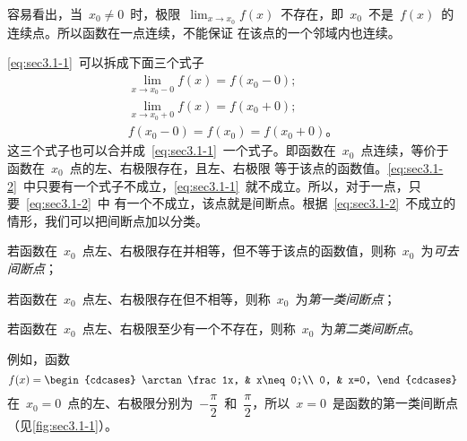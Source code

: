 \begin{remark}
容易看出，当~$x_0\neq0$~时，极限~$\lim_{x\to x_0}f(x)$~不存在，即~$x_0$~不是~$f(x)$~的连续点。所以函数在一点连续，不能保证
在该点的一个邻域内也连续。
\end{remark}

\ref{eq:sec3.1-1}~可以拆成下面三个式子
\begin{equation}\label{eq:sec3.1-2}
\begin{gathered}
\lim_{x\to x_0-0}f(x)=f(x_0-0);\\
\lim_{x\to x_0+0}f(x)=f(x_0+0);\\
f(x_0-0)=f(x_0)=f(x_0+0) 。
\end{gathered}
\end{equation}
这三个式子也可以合并成~\ref{eq:sec3.1-1}~一个式子。即函数在~$x_0$~点连续，等价于函数在~$x_0$~点的左、右极限存在，且左、右极限
等于该点的函数值。\ref{eq:sec3.1-2}~中只要有一个式子不成立，\ref{eq:sec3.1-1}~就不成立。所以，对于一点，只要~\ref{eq:sec3.1-2}~中
有一个不成立，该点就是间断点。根据~\ref{eq:sec3.1-2}~不成立的情形，我们可以把间断点加以分类。

\begin{definition}\label{def:sec3.1-2}
\begin{thmenumlist}
\item 若函数在~$x_0$~点左、右极限存在并相等，但不等于该点的函数值，则称~$x_0$~为\emph{可去间断点}；
\item 若函数在~$x_0$~点左、右极限存在但不相等，则称~$x_0$~为\emph{第一类间断点}；
\item 若函数在~$x_0$~点左、右极限至少有一个不存在，则称~$x_0$~为\emph{第二类间断点}。
\end{thmenumlist}
\end{definition}

例如，函数
\[
  f(x)=\begin{cdcases}
    \arctan\frac1x, & x\neq0;\\
    0, & x=0,
  \end{cdcases}
\]
在~$x_0=0$~点的左、右极限分别为~$-\dfrac\pi2$~和~$\dfrac\pi2$，所以~$x=0$~是函数的第一类间断点（见\ref{fig:sec3.1-1}）。

\begin{figure}
\begin{floatrow}[3]
\figurebox{\caption{}\label{fig:sec3.1-1}}
          {\somefigure}
\figurebox{\caption{}\label{fig:sec3.1-2}}
          {\somefigure}
\figurebox{\caption{}\label{fig:sec3.1-3}}
          {\somefigure}
\end{floatrow}
\end{figure}

